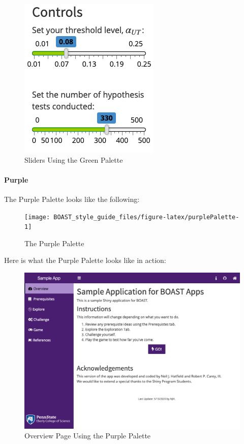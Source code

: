\documentclass[
]{book}
\begin{document}
\begin{figure}

{\centering \includegraphics{images/greenSliders} 

}

\caption{Sliders Using the Green Palette}\label{fig:greenAction3}
\end{figure}

\hypertarget{purple}{%
\paragraph{Purple}\label{purple}}

The Purple Palette looks like the following:

\begin{figure}

{\centering \texttt{[image: BOAST\_style\_guide\_files/figure-latex/purplePalette-1]} 

}

\caption{The Purple Palette}\label{fig:purplePalette}
\end{figure}

Here is what the Purple Palette looks like in action:

\begin{figure}

{\centering \includegraphics[width=14in]{images/purpleOverview} 

}

\caption{Overview Page Using the Purple Palette}\label{fig:purpleAction1}
\end{figure}
\end{document}
